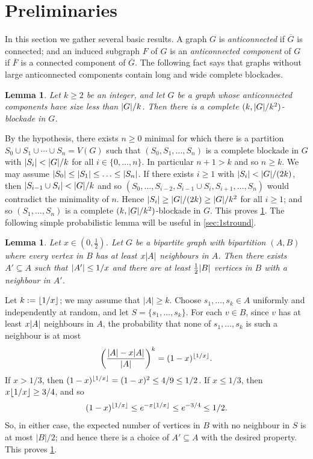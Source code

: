 \documentclass[11pt,reqno,a4paper]{amsart}
\newtheorem{lemma}[theorem]{Lemma}
\let\oldendproof\endproof
\renewenvironment{proof}[1][\proofname]{%
	\oldproof[\normalfont\bfseries #1]%
}{\oldendproof}
\renewcommand{\subset}{\subseteq}
\newcommand{\LL}{,\ldots,}
\DeclarePairedDelimiter\abs{\lvert}{\rvert}%
\DeclarePairedDelimiter\floor{\lfloor}{\rfloor}%
\begin{document}
	\section{Preliminaries}
	\label{sec:prelim}
	In this section we gather several basic results.
	A graph $G$ is {\em anticonnected} if $\overline G$ is connected; and an induced subgraph $F$ of $G$ is an {\em anticonnected component} of $G$ if $\overline F$ is a connected component of $\overline G$.
	The following fact says that graphs without large anticonnected components contain long and wide complete blockades.
	\begin{lemma}
		\label{lem:cores}
		Let $k\ge2$ be an integer, and let $G$ be a graph whose anticonnected components have size less than $\abs G/k$. Then there is a complete $(k,\abs G/k^2)$-blockade in $G$.
	\end{lemma}
	\begin{proof}
		By the hypothesis, there exists $n\ge0$ minimal for which there is a partition $S_0\cup S_1\cup\cdots\cup S_n=V(G)$
		such that $(S_0,S_1,\ldots,S_n)$ is a complete blockade in $G$ with $\abs{S_i}<\abs G/k$ for all $i\in\{0,\dots,n\}$.
		In particular $n+1>k$ and so $n\ge k$.
		We may assume $\abs{S_0}\le\abs{S_1}\le\ldots\le\abs{S_n}$.
		If there exists $i\ge1$ with $\abs{S_i}<\abs G/(2k)$,
		then $\abs{S_{i-1}\cup S_i}<\abs G/k$ and so $(S_0,\ldots,S_{i-2},S_{i-1}\cup S_i,S_{i+1},\ldots,S_n)$ would contradict the minimality of $n$.
		Hence $\abs{S_i}\ge\abs G/(2k)\ge\abs G/k^2$ for all $i\ge1$;
		and so $(S_1,\ldots,S_n)$ is a complete $(k,\abs G/k^2)$-blockade in $G$.
		This proves \cref{lem:cores}.
	\end{proof}
	The following simple probabilistic lemma will be useful in \cref{sec:1stround}.
	\begin{lemma}
		\label{lem:locate}
		Let $x\in(0,\frac12)$.
		Let $G$ be a bipartite graph with bipartition $(A,B)$ where every vertex in $B$ has at least $x\abs A$ neighbours in $A$.
		Then there exists $A'\subset A$ such that $\abs {A'}\le1/x$ and there are at least $\frac12\abs B$ vertices in $B$ with a neighbour in $A'$.
	\end{lemma}
	\begin{proof}
		Let $k:=\floor{1/x}$; we may assume that $|A|\ge k$. Choose $s_1\LL s_k\in A$ uniformly and independently at random, and let $S=\{s_1\LL s_k\}$.
		For each $v\in B$, since $v$ has at least $x\abs A$ neighbours in $A$, the probability that none of $s_1\LL s_k$ is such a neighbour is at most
		\[\left(\frac{\abs A-x\abs A}{\abs A}\right)^k
		=(1-x)^{\floor{1/x}}.\]
		If $x> 1/3$, then $(1-x)^{\floor{1/x}}= (1-x)^2\le 4/9\le 1/2$. If $x\le 1/3$, then $x\floor{1/x}\ge 3/4$, and so
		\[(1-x)^{\floor{1/x}} \le e^{-x\floor{1/x}} \le e^{-3/4}\le 1/2.\]
		So, in either case, the expected number of vertices in $B$ with no neighbour in $S$ is at most $|B|/2$;
		and hence there is a choice of $A'\subseteq A$ with the desired property.
		This proves \cref{lem:locate}.
	\end{proof}
\end{document}
